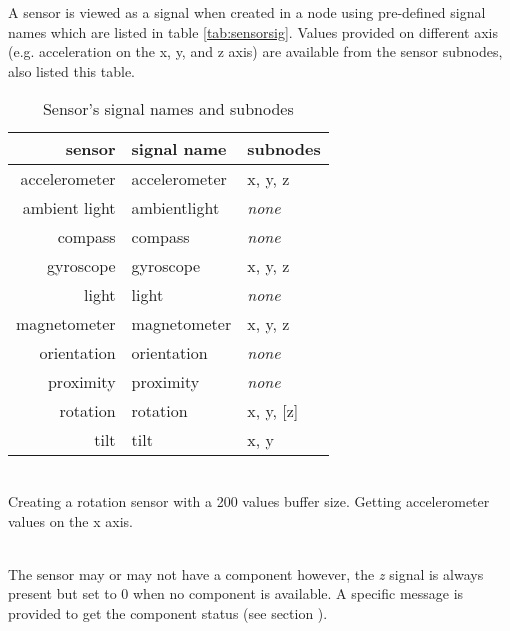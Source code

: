 \label{sensorSignal}

A sensor is viewed as a signal when created in a  node using pre-defined signal names which are listed in table \ref{tab:sensorsig}. Values provided on different axis (e.g. acceleration on the x, y, and z axis) are available from the sensor subnodes, also listed this table. 

\label{tab:sensorsig}

\begin{table*}[htbp]
\begin{center}
\begin{tabular}{rll}
\hline
sensor & signal name		&	subnodes \\
\hline
accelerometer	& accelerometer		& x, y, z \\
ambient light	& ambientlight		& \textit{none} \\
compass			& compass			& \textit{none} \\
gyroscope		& gyroscope			& x, y, z \\
light			& light				& \textit{none} \\
magnetometer	& magnetometer		& x, y, z \\
orientation		& orientation		& \textit{none} \\
proximity		& proximity			& \textit{none} \\
rotation		& rotation			& x, y, [z] \\
tilt			& tilt 				& x, y \\
\hline
\end{tabular}
\end{center}
\caption{Sensor's signal names and subnodes}
\end{table*}


\example \\
Creating a rotation sensor with a 200 values buffer size.
Getting accelerometer values on the x axis.

\note\\
The  sensor may or may not have a  component however, the \textit{z} signal is always present but set to 0 when no  component is available. A specific message is provided to get the  component status (see section ).



\label{sensorNode}

